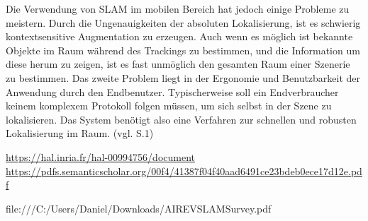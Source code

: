 Die Verwendung von SLAM im mobilen Bereich hat jedoch einige Probleme zu meistern. Durch die Ungenauigkeiten der absoluten Lokalisierung, ist es schwierig kontextsensitive Augmentation zu erzeugen. Auch wenn es möglich ist bekannte Objekte im Raum während des Trackings zu bestimmen, und die Information um diese herum zu zeigen, ist es fast unmöglich den gesamten Raum einer Szenerie zu bestimmen. Das zweite Problem liegt in der Ergonomie und Benutzbarkeit der Anwendung durch den Endbenutzer. Typischerweise soll ein Endverbraucher keinem komplexem Protokoll folgen müssen, um sich selbst in der Szene zu lokalisieren. Das System benötigt also eine Verfahren zur schnellen und robusten Lokalisierung im Raum. (vgl. \cite{slam_mobile} S.1)



\url{https://hal.inria.fr/hal-00994756/document}
\url{https://pdfs.semanticscholar.org/00f4/41387f04f40aad6491ce23bdeb0ece17d12e.pdf}


file:///C:/Users/Daniel/Downloads/AIREVSLAMSurvey.pdf


